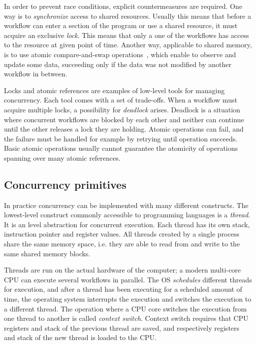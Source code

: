 In order to prevent race conditions, explicit countermeasures are required. One way is to \emph{synchronize} access to shared resources. Usually this means that before a workflow can enter a section of the program or use a shared resource, it must acquire an exclusive \emph{lock}. This means that only a one of the workflows has access to the resource at given point of time. Another way, applicable to shared memory, is to use atomic compare-and-swap operations~\cite{concurrent-queue-algorithms}, which enable to observe and update some data, succeeding only if the data was not modified by another workflow in between.

Locks and atomic references are examples of low-level tools for managing concurrency. Each tool comes with a set of trade-offs. When a workflow must acquire multiple locks, a possibility for \emph{deadlock} arises. Deadlock is a situation where concurrent workflows are blocked by each other and neither can continue until the other releases a lock they are holding. Atomic operations can fail, and the failure must be handled for example by retrying until operation succeeds. Basic atomic operations usually cannot guarantee the atomicity of operations spanning over many atomic references.


\subsection{Concurrency primitives}
In practice concurrency can be implemented with many different constructs. The lowest-level construct commonly accessible to programming languages is a \textit{thread}. It is an  level abstraction for concurrent execution. Each thread has its own stack, instruction pointer and  register values. All threads created by a single process share the same memory space, i.e. they are able to read from and write to the same shared memory blocks.

Threads are run on the actual hardware of the computer; a modern multi-core CPU can execute several workflows in parallel. The OS \textit{schedules} different threads for execution, and after a thread has been executing for a scheduled amount of time, the operating system interrupts the execution and switches the execution to a different thread. The operation where a CPU core switches the execution from one thread to another is called \textit{context switch}. Context switch requires that CPU registers and stack of the previous thread are saved, and respectively registers and stack of the new thread is loaded to the CPU.

